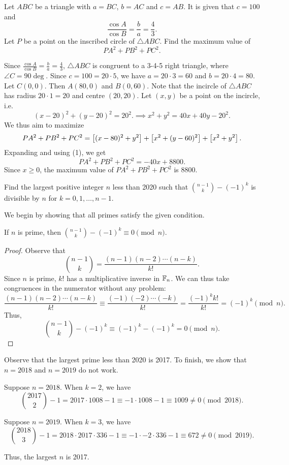 \begin{question}[8800]\label{Q::2020-O-1-17}
    Let $ABC$ be a triangle with $a = BC$, $b = AC$ and $c = AB$. It is given that $c = 100$ and \[\frac{\cos A}{\cos B} = \frac{b}{a} = \frac43.\] Let $P$ be a point on the inscribed circle of $\triangle ABC$. Find the maximum value of \[PA^2 + PB^2 + PC^2.\]
\end{question}
\begin{solution*}
    Since $\frac{\cos A}{\cos B} = \frac{b}{a} = \frac43$, $\triangle ABC$ is congruent to a 3-4-5 right triangle, where $\angle C = 90\deg$. Since $c = 100 = 20 \cdot 5$, we have $a = 20 \cdot 3 = 60$ and $b = 20 \cdot 4 = 80$. Let $C(0,0)$. Then $A(80, 0)$ and $B(0, 60)$. Note that the incircle of $\triangle ABC$ has radius $20 \cdot 1 = 20$ and centre $(20, 20)$. Let $(x, y)$ be a point on the incircle, i.e. \[(x-20)^2 + (y-20)^2 = 20^2.\implies x^2 + y^2 = 40x + 40y - 20^2 \tag{1}.\] We thus aim to maximize \[PA^2 + PB^2 + PC^2 = \left[ (x-80)^2 + y^2 \right] + \left[ x^2 + (y-60)^2 \right] + \left[ x^2 + y^2 \right].\] Expanding and using (1), we get \[PA^2 + PB^2 + PC^2 = -40x + 8800.\] Since $x \geq 0$, the maximum value of $PA^2 + PB^2 + PC^2$ is 8800.
\end{solution*}

\begin{question}[2017]\label{Q::2020-O-1-18}
    Find the largest positive integer $n$ less than 2020 such that $\binom{n-1}{k} - (-1)^k$ is divisible by $n$ for $k = 0, 1, \ldots, n-1$.
\end{question}
\begin{solution*}
    We begin by showing that all primes satisfy the given condition.
    \begin{claim}
        If $n$ is prime, then $\binom{n-1}{k} - (-1)^k \equiv 0 \pmod{n}$.
    \end{claim}
    \begin{proof}
        Observe that \[\binom{n-1}{k} = \frac{(n-1)(n-2)\cdots(n-k)}{k!}.\] Since $n$ is prime, $k!$ has a multiplicative inverse in $\mathbb{F}_n$. We can thus take congruences in the numerator without any problem: \[\frac{(n-1)(n-2)\cdots(n-k)}{k!} \equiv \frac{(-1)(-2)\cdots(-k)}{k!} = \frac{(-1)^k k!}{k!} = (-1)^k \pmod{n}.\] Thus, \[\binom{n-1}{k} - (-1)^k \equiv (-1)^k - (-1)^k = 0 \pmod{n}.\]
    \end{proof}
    
    Observe that the largest prime less than 2020 is 2017. To finish, we show that $n = 2018$ and $n = 2019$ do not work.
    
     Suppose $n = 2018$. When $k = 2$, we have \[\binom{2017}{2} - 1 = 2017 \cdot 1008 - 1 \equiv -1 \cdot 1008 - 1 \equiv 1009 \neq 0 \pmod{2018}.\]
    
     Suppose $n = 2019$. When $k = 3$, we have \[\binom{2018}{3} - 1 = 2018 \cdot 2017 \cdot 336 - 1 \equiv -1 \cdot -2 \cdot 336 - 1 \equiv 672 \neq 0 \pmod{2019}.\]
    
    Thus, the largest $n$ is 2017.
\end{solution*}

